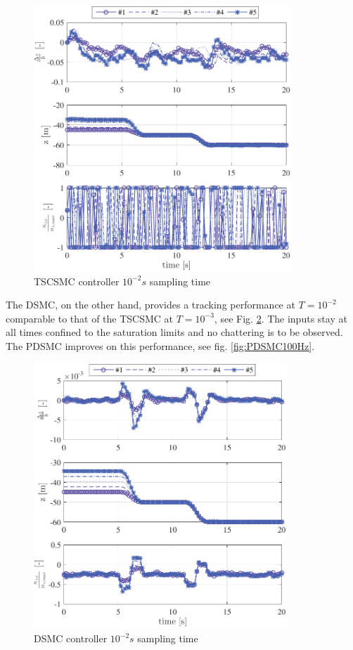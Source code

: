 \documentclass{ifacconf}
\begin{document}
\begin{figure} [h!]
\begin{center}
\includegraphics[width=\columnwidth,height=10cm]{TSCSMC-100Hz-TIMESCALESEPARATION-turbulence=1}    %
\caption{ TSCSMC controller $10^{-2} s$ sampling time}
\label{fig:CSMC100Hz}
\end{center}
\end{figure}
The DSMC, on the other hand, provides a tracking performance at $T = 10^{-2}$ comparable to that of the TSCSMC at $T = 10^{-3}$, see Fig. \ref{fig:DSMC100Hz}. The inputs stay at all times confined to the saturation limits and no chattering is to be observed. The PDSMC improves on this performance, see fig. \ref{fig:PDSMC100Hz}.
\begin{figure}[h!]
\begin{center}
\includegraphics[width=\columnwidth,height=10cm]{DSMC-100Hz-TIMESCALESEPARATION-turbulence=1}    %
\caption{ DSMC controller $10^{-2} s$ sampling time}
\label{fig:DSMC100Hz}
\end{center}
\end{figure}
\end{document}

